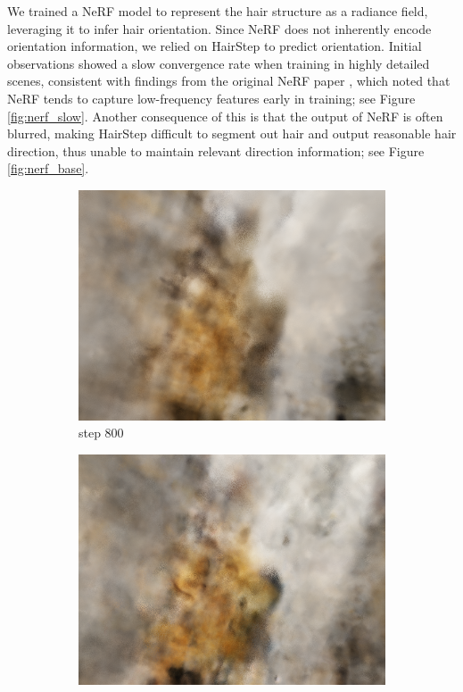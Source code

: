 \documentclass[12pt]{article}
\begin{document}
We trained a NeRF model to represent the hair structure as a radiance field, leveraging it to infer hair orientation. Since NeRF does not inherently encode orientation information, we relied on HairStep to predict orientation. Initial observations showed a slow convergence rate when training in highly detailed scenes, consistent with findings from the original NeRF paper \cite{mildenhall_nerf_2020}, which noted that NeRF tends to capture low-frequency features early in training; see Figure \ref{fig:nerf_slow}. Another consequence of this is that the output of NeRF is often blurred, making HairStep difficult to segment out hair and output reasonable hair direction, thus unable to maintain relevant direction information; see Figure \ref{fig:nerf_base}.
\begin{figure}[h]
\centering
\begin{subfigure}{0.3\textwidth}
\centering
\includegraphics[width=\textwidth]{./images/nerf_pred/nerf_800.png}
\caption{step 800}
\end{subfigure}
\hfill
\begin{subfigure}{0.3\textwidth}
\centering
\includegraphics[width=\textwidth]{./images/nerf_pred/nerf_4000.png}

\end{subfigure}
\end{figure}
\end{document}
